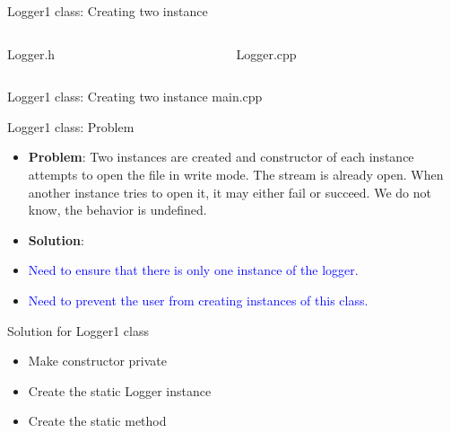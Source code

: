 \documentclass[13pt]{beamer}
\begin{document}
\begin{frame}{Logger1 class: Creating two instance}
\begin{columns}[T]
\begin{column}{.48\textwidth}
\lstset{basicstyle=\tiny,style=myCustomCppStyle}
Logger.h

\end{column}

\begin{column}{.48\textwidth}
\lstset{basicstyle=\tiny,style=myCustomCppStyle}
Logger.cpp

\end{column}
\end{columns}
\end{frame}

\begin{frame}{Logger1 class: Creating two instance}
main.cpp
\lstset{basicstyle=\tiny,style=myCustomCppStyle}

\end{frame}

\begin{frame}{Logger1 class: Problem}
\begin{itemize}
\setlength\itemsep{1em}

\item \textbf{Problem}: Two instances are created and constructor of each instance attempts to open the file in write mode. The stream is already open. When another instance tries to open it, it may either fail or succeed. We do not know, the behavior is undefined.

\item \textbf{Solution}:

\item \textcolor{blue}{Need to ensure that there is only one instance of the logger.}

\item \textcolor{blue}{Need to prevent the user from creating instances of this class.}
\end{itemize}
\end{frame}

\begin{frame}{Solution for Logger1 class}
\begin{itemize}
\item Make constructor private

\item Create the static Logger instance

\item Create the static method
\end{itemize}
\end{frame}
\end{document}
